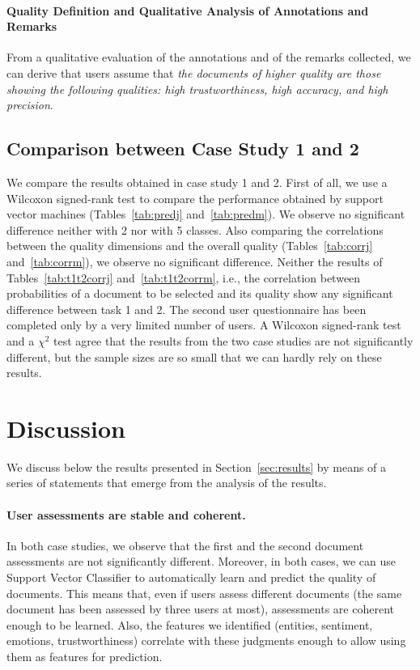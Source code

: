 \documentclass{llncs}
\begin{document}
\paragraph{Quality Definition and Qualitative Analysis of Annotations and Remarks}
From a qualitative evaluation of the annotations and of the remarks collected, we can derive that users assume that \emph{the documents of higher quality are those showing the following qualities: high trustworthiness, high accuracy, and high precision}.

\subsection{Comparison between Case Study 1 and 2}
We compare the results obtained in case study 1 and 2.
First of all, we use a Wilcoxon signed-rank test to compare the performance obtained by support vector machines (Tables~\ref{tab:predj} and~\ref{tab:predm}). We observe no significant difference neither with 2 nor with 5 classes.
Also comparing the correlations between the quality dimensions and the overall quality (Tables~\ref{tab:corrj} and~\ref{tab:corrm}), we observe no significant difference.
Neither the results of Tables~\ref{tab:t1t2corrj} and~\ref{tab:t1t2corrm}, i.e., the correlation between probabilities of a document to be selected and its quality show any significant difference between task 1 and 2.
The second user questionnaire has been completed only by a very limited number of users. A Wilcoxon signed-rank test and a $\chi^2$ test agree that the results from the two case studies are not significantly different, but the sample sizes are so small that we can hardly rely on these results.
\section{Discussion}
\label{sec:discussion}
We discuss below the results presented in Section~\ref{sec:results} by means of a series of statements that emerge from the analysis of the results. %
\paragraph{{\bf User assessments are stable and coherent.}} In both case studies, we observe that the first and the second document assessments are not significantly different. Moreover, in both cases, we can use Support Vector Classifier to automatically learn and predict the quality of documents. This means that, even if users assess different documents (the same document has been assessed by three users at most), assessments are coherent enough to be learned. Also, the features we identified (entities, sentiment, emotions, trustworthiness) correlate with these judgments enough to allow using them as features for prediction. 
\end{document}
